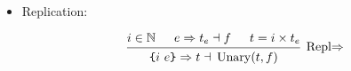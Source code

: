 \documentclass{article}
\DeclareMathOperator{\Unary}{Unary}
\renewcommand{\S}{\ensuremath{\Rightarrow}}
\newcommand{\s}[3]{#1 \S{} #2 \dashv{} #3}
\begin{document}
\begin{itemize}[leftmargin=*]
	\item Replication:

	      \begin{equation*}
		      \begin{prooftree}
			      \hypo{i \in \mathbb{N}}
			      \hypo{\s{e}{t_e}{f}}
			      \hypo{t = i \times t_e}
			      \infer3[Repl\S]{\s{\texttt{\{}i~e\texttt{\}}}{t}{\Unary(t, f)}}
		      \end{prooftree}
	      \end{equation*}
\end{itemize}
\end{document}
